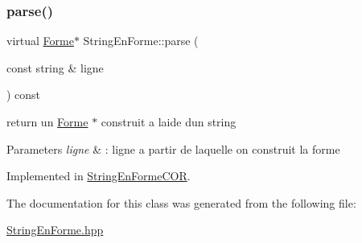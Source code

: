 \subsubsection{\texorpdfstring{parse()}{parse()}}
{\footnotesize\ttfamily virtual \mbox{\hyperlink{class_forme}{Forme}}$\ast$ String\+En\+Forme\+::parse (\begin{DoxyParamCaption}\item[{const string \&}]{ligne }\end{DoxyParamCaption}) const\hspace{0.3cm}{\ttfamily [pure virtual]}}



return un \mbox{\hyperlink{class_forme}{Forme}} $\ast$ construit a l\textquotesingle{}aide d\textquotesingle{}un string 


\begin{DoxyParams}{Parameters}
{\em ligne} & \+: ligne a partir de laquelle on construit la forme \\
\hline
\end{DoxyParams}


Implemented in \mbox{\hyperlink{class_string_en_forme_c_o_r_ab0b1d2efc8fdcf027cbc7241c498a024}{String\+En\+Forme\+C\+OR}}.



The documentation for this class was generated from the following file\+:\begin{DoxyCompactItemize}
\item 
\mbox{\hyperlink{_string_en_forme_8hpp}{String\+En\+Forme.\+hpp}}\end{DoxyCompactItemize}
